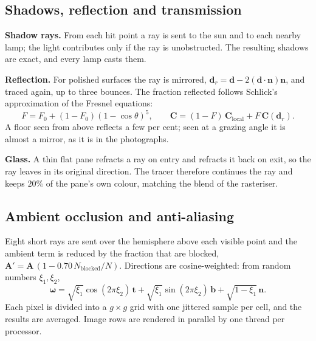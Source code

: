 \documentclass[11pt,a4paper]{article}
\newcommand{\vect}[1]{\mathbf{#1}}
\begin{document}
\subsection{Shadows, reflection and transmission}
\textbf{Shadow rays.} From each hit point a ray is sent to the sun and to
each nearby lamp; the light contributes only if the ray is unobstructed.
The resulting shadows are exact, and every lamp casts them.

\textbf{Reflection.} For polished surfaces the ray is mirrored,
$\vect d_r=\vect d-2(\vect d\cdot\vect n)\vect n$, and traced again, up to
three bounces. The fraction reflected follows Schlick's approximation of
the Fresnel equations:
\begin{equation}
F=F_0+(1-F_0)(1-\cos\theta)^{5},\qquad
\vect C=(1-F)\,\vect C_{\mathrm{local}}+F\,\vect C(\vect d_r).
\end{equation}
A floor seen from above reflects a few per cent; seen at a grazing angle it
is almost a mirror, as it is in the photographs.

\textbf{Glass.} A thin flat pane refracts a ray on entry and refracts it
back on exit, so the ray leaves in its original direction. The tracer
therefore continues the ray and keeps $20\%$ of the pane's own colour,
matching the blend of the rasteriser.

\subsection{Ambient occlusion and anti-aliasing}
Eight short rays are sent over the hemisphere above each visible point and
the ambient term is reduced by the fraction that are blocked,
$\vect A'=\vect A\,(1-0.70\,N_{\mathrm{blocked}}/N)$. Directions are
cosine-weighted: from random numbers $\xi_1,\xi_2$,
\begin{equation}
\boldsymbol\omega=\sqrt{\xi_1}\cos(2\pi\xi_2)\,\vect t
+\sqrt{\xi_1}\sin(2\pi\xi_2)\,\vect b+\sqrt{1-\xi_1}\,\vect n .
\end{equation}
Each pixel is divided into a $g\times g$ grid with one jittered sample per
cell, and the results are averaged. Image rows are rendered in parallel by
one thread per processor.
\end{document}
